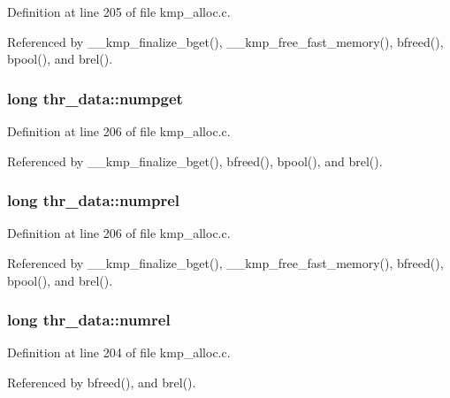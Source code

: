 Definition at line 205 of file kmp\-\_\-alloc.\-c.



Referenced by \-\_\-\-\_\-kmp\-\_\-finalize\-\_\-bget(), \-\_\-\-\_\-kmp\-\_\-free\-\_\-fast\-\_\-memory(), bfreed(), bpool(), and brel().

\hypertarget{structthr__data_a5351a12df0ac848e4148dd2466a4026d}{
\subsubsection[{numpget}]{\setlength{\rightskip}{0pt plus 5cm}long thr\-\_\-data\-::numpget}}\label{structthr__data_a5351a12df0ac848e4148dd2466a4026d}


Definition at line 206 of file kmp\-\_\-alloc.\-c.



Referenced by \-\_\-\-\_\-kmp\-\_\-finalize\-\_\-bget(), bfreed(), bpool(), and brel().

\hypertarget{structthr__data_ac9ff0cac89239d263184e77107c03b7d}{
\subsubsection[{numprel}]{\setlength{\rightskip}{0pt plus 5cm}long thr\-\_\-data\-::numprel}}\label{structthr__data_ac9ff0cac89239d263184e77107c03b7d}


Definition at line 206 of file kmp\-\_\-alloc.\-c.



Referenced by \-\_\-\-\_\-kmp\-\_\-finalize\-\_\-bget(), \-\_\-\-\_\-kmp\-\_\-free\-\_\-fast\-\_\-memory(), bfreed(), bpool(), and brel().

\hypertarget{structthr__data_a391d2806f8e5595fb66a01484c860bf0}{
\subsubsection[{numrel}]{\setlength{\rightskip}{0pt plus 5cm}long thr\-\_\-data\-::numrel}}\label{structthr__data_a391d2806f8e5595fb66a01484c860bf0}


Definition at line 204 of file kmp\-\_\-alloc.\-c.



Referenced by bfreed(), and brel().


